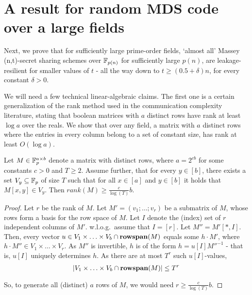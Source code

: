 \chapter{A result for random MDS code over a large fields}
\label{sec:random-mds} 

Next, we prove that for sufficiently large prime-order fields, `almost all' Massey (n,t)-secret sharing schemes over $\mathbb{F}_{p(n)}$ for sufficiently large $p(n)$, are leakage-resilient for smaller values of $t$ - all the way down to $t\geq (0.5 +\delta)n$, for every constant $\delta>0$. 

We will need a few technical linear-algebraic  claims. The first one is a certain generalization of the rank method used in the communication complexity literature, stating that boolean matrices with $a$ distinct rows have rank at least $\log{a}$ over the reals. We show that over any field, a matrix with $a$ distinct rows where the entries in every column belong to a set of constant size, has rank at least $O(\log{a})$. 

\begin{claim}\label{rank}
Let $M\in\mathbb{F}^{a\times b}_p$ denote a matrix with distinct rows, where $a=2^{cb}$ for some constants 
$c > 0$ and $T\geq 2$. Assume further, that for every $y\in[b]$, there exists a set $V_y\subseteq \mathbb{F}_p$ of size $T$ such that for all $x\in[a]$ and $y\in[b]$ it holds that $M[x,y]\in V_y$. Then $rank(M)\geq  \frac{c}{\log(T)}b$.
\end{claim}


\begin{proof}
Let $r$ be the rank of $M$. Let $M'=(v_1;\ldots;v_r)$ be a submatrix of $M$, whose rows form a basis for the row space of $M$. Let $I$ denote the (index) set of $r$ independent columns of $M'$. w.l.o.g.\ assume that $I=[r]$. Let $M''=M'[*,I]$. Then, every vector $u\in V_1\times\ldots\times V_b\cap \mathbf{rowspan}(M)$ equals some $h\cdot M'$, where $h\cdot M''\in V_1\times\ldots\times V_r$. As $M''$ is invertible, $h$ is of the form
$h = u[I] {M''}^{-1}$ - that is, $u[I]$ uniquely determines $h$. 
As there are at most $T^r$ such $u[I]$-values, 
\begin{align}
\left|V_1\times\ldots\times V_b \cap \mathbf{rowspan}(M)\right|\leq T^r
\end{align}

So, to generate all (distinct) $a$ rows of $M$, we would need $r\geq \frac{c}{\log(T)}b$.
\end{proof}

